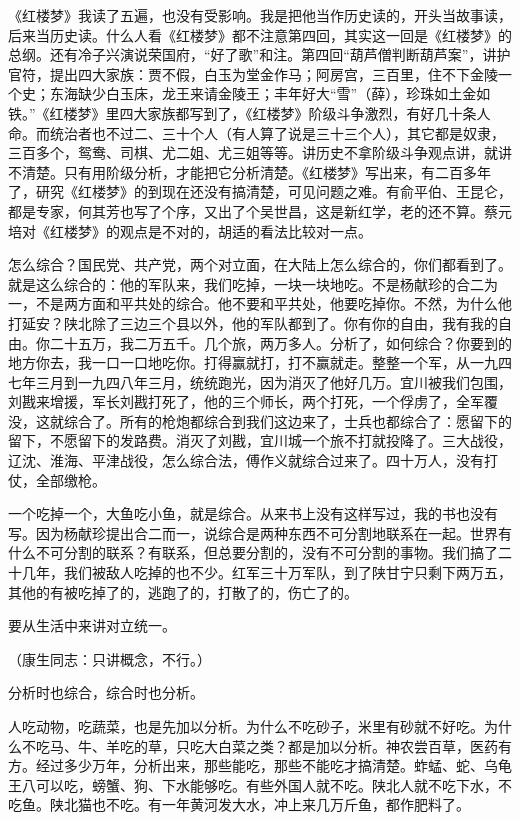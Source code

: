 《红楼梦》我读了五遍，也没有受影响。我是把他当作历史读的，开头当故事读，后来当历史读。什么人看《红楼梦》都不注意第四回，其实这一回是《红楼梦》的总纲。还有冷子兴演说荣国府，“好了歌”和注。第四回“葫芦僧判断葫芦案”，讲护官符，提出四大家族：贾不假，白玉为堂金作马；阿房宫，三百里，住不下金陵一个史；东海缺少白玉床，龙王来请金陵王；丰年好大“雪”（薛），珍珠如土金如铁。”《红楼梦》里四大家族都写到了，《红楼梦》阶级斗争激烈，有好几十条人命。而统治者也不过二、三十个人（有人算了说是三十三个人），其它都是奴隶，三百多个，鸳鸯、司棋、尤二姐、尤三姐等等。讲历史不拿阶级斗争观点讲，就讲不清楚。只有用阶级分析，才能把它分析清楚。《红楼梦》写出来，有二百多年了，研究《红楼梦》的到现在还没有搞清楚，可见问题之难。有俞平伯、王昆仑，都是专家，何其芳也写了个序，又出了个吴世昌，这是新红学，老的还不算。蔡元培对《红楼梦》的观点是不对的，胡适的看法比较对一点。

怎么综合？国民党、共产党，两个对立面，在大陆上怎么综合的，你们都看到了。就是这么综合的：他的军队来，我们吃掉，一块一块地吃。不是杨献珍的合二为一，不是两方面和平共处的综合。他不要和平共处，他要吃掉你。不然，为什么他打延安？陕北除了三边三个县以外，他的军队都到了。你有你的自由，我有我的自由。你二十五万，我二万五千。几个旅，两万多人。分析了，如何综合？你要到的地方你去，我一口一口地吃你。打得赢就打，打不赢就走。整整一个军，从一九四七年三月到一九四八年三月，统统跑光，因为消灭了他好几万。宜川被我们包围，刘戡来增援，军长刘戡打死了，他的三个师长，两个打死，一个俘虏了，全军覆没，这就综合了。所有的枪炮都综合到我们这边来了，士兵也都综合了：愿留下的留下，不愿留下的发路费。消灭了刘戡，宜川城一个旅不打就投降了。三大战役，辽沈、淮海、平津战役，怎么综合法，傅作义就综合过来了。四十万人，没有打仗，全部缴枪。

一个吃掉一个，大鱼吃小鱼，就是综合。从来书上没有这样写过，我的书也没有写。因为杨献珍提出合二而一，说综合是两种东西不可分割地联系在一起。世界有什么不可分割的联系？有联系，但总要分割的，没有不可分割的事物。我们搞了二十几年，我们被敌人吃掉的也不少。红军三十万军队，到了陕甘宁只剩下两万五，其他的有被吃掉了的，逃跑了的，打散了的，伤亡了的。

要从生活中来讲对立统一。

（康生同志：只讲概念，不行。）

分析时也综合，综合时也分析。

人吃动物，吃蔬菜，也是先加以分析。为什么不吃砂子，米里有砂就不好吃。为什么不吃马、牛、羊吃的草，只吃大白菜之类？都是加以分析。神农尝百草，医药有方。经过多少万年，分析出来，那些能吃，那些不能吃才搞清楚。蚱蜢、蛇、乌龟王八可以吃，螃蟹、狗、下水能够吃。有些外国人就不吃。陕北人就不吃下水，不吃鱼。陕北猫也不吃。有一年黄河发大水，冲上来几万斤鱼，都作肥料了。

